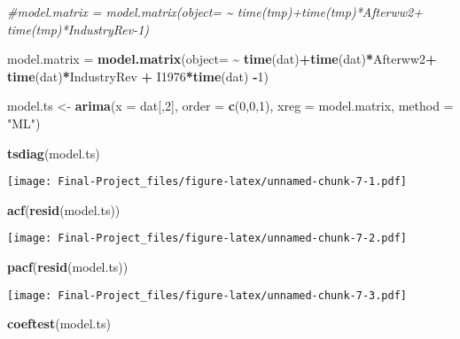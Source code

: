 \documentclass[
]{article}
\newenvironment{Shaded}{\begin{snugshade}}{\end{snugshade}}
\newcommand{\AttributeTok}[1]{\textcolor[rgb]{0.13,0.29,0.53}{#1}}
\newcommand{\CommentTok}[1]{\textcolor[rgb]{0.56,0.35,0.01}{\textit{#1}}}
\newcommand{\DecValTok}[1]{\textcolor[rgb]{0.00,0.00,0.81}{#1}}
\newcommand{\FunctionTok}[1]{\textcolor[rgb]{0.13,0.29,0.53}{\textbf{#1}}}
\newcommand{\NormalTok}[1]{#1}
\newcommand{\OtherTok}[1]{\textcolor[rgb]{0.56,0.35,0.01}{#1}}
\newcommand{\SpecialCharTok}[1]{\textcolor[rgb]{0.81,0.36,0.00}{\textbf{#1}}}
\newcommand{\StringTok}[1]{\textcolor[rgb]{0.31,0.60,0.02}{#1}}
\begin{document}
\begin{Shaded}
\begin{Highlighting}[]
\CommentTok{\#model.matrix = model.matrix(object= \textasciitilde{} time(tmp)+time(tmp)*Afterww2+ time(tmp)*IndustryRev{-}1)}




\NormalTok{model.matrix }\OtherTok{=} \FunctionTok{model.matrix}\NormalTok{(}\AttributeTok{object=} \SpecialCharTok{\textasciitilde{}} \FunctionTok{time}\NormalTok{(dat)}\SpecialCharTok{+}\FunctionTok{time}\NormalTok{(dat)}\SpecialCharTok{*}\NormalTok{Afterww2}\SpecialCharTok{+} \FunctionTok{time}\NormalTok{(dat)}\SpecialCharTok{*}\NormalTok{IndustryRev }\SpecialCharTok{+}\NormalTok{ I1976}\SpecialCharTok{*}\FunctionTok{time}\NormalTok{(dat) }\SpecialCharTok{{-}}\DecValTok{1}\NormalTok{)}

\NormalTok{model.ts }\OtherTok{\textless{}{-}} \FunctionTok{arima}\NormalTok{(}\AttributeTok{x =}\NormalTok{ dat[,}\DecValTok{2}\NormalTok{], }\AttributeTok{order =} \FunctionTok{c}\NormalTok{(}\DecValTok{0}\NormalTok{,}\DecValTok{0}\NormalTok{,}\DecValTok{1}\NormalTok{),  }\AttributeTok{xreg =}\NormalTok{ model.matrix, }\AttributeTok{method =} \StringTok{"ML"}\NormalTok{)}

\FunctionTok{tsdiag}\NormalTok{(model.ts)}
\end{Highlighting}
\end{Shaded}

\texttt{[image: Final-Project\_files/figure-latex/unnamed-chunk-7-1.pdf]}

\begin{Shaded}
\begin{Highlighting}[]
\FunctionTok{acf}\NormalTok{(}\FunctionTok{resid}\NormalTok{(model.ts))}
\end{Highlighting}
\end{Shaded}

\texttt{[image: Final-Project\_files/figure-latex/unnamed-chunk-7-2.pdf]}

\begin{Shaded}
\begin{Highlighting}[]
\FunctionTok{pacf}\NormalTok{(}\FunctionTok{resid}\NormalTok{(model.ts))}
\end{Highlighting}
\end{Shaded}

\texttt{[image: Final-Project\_files/figure-latex/unnamed-chunk-7-3.pdf]}

\begin{Shaded}
\begin{Highlighting}[]
\FunctionTok{coeftest}\NormalTok{(model.ts)}
\end{Highlighting}
\end{Shaded}
\end{document}
